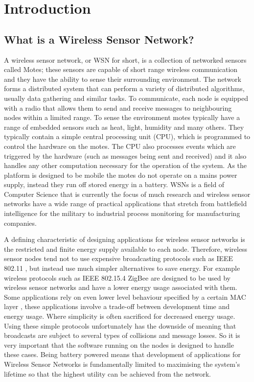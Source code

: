 \section{Introduction}

\subsection{What is a Wireless Sensor Network?}

A wireless sensor network, or WSN for short, is a collection of networked sensors called Motes; these sensors are capable of short range wireless communication and they have the ability to sense their surrounding environment\cite{Mica2002,TankBible}. The network forms a distributed system that can perform a variety of distributed algorithms, usually data gathering and similar tasks. To communicate, each node is equipped with a radio that allows them to send and receive messages to neighbouring nodes within a limited range. To sense the environment motes typically have a range of embedded sensors such as heat, light, humidity and many others. They typically contain a simple central processing unit (CPU), which is programmed to control the hardware on the motes. The CPU also processes events which are triggered by the hardware (such as messages being sent and received) and it also handles any other computation necessary for the operation of the system. As the platform is designed to be mobile the motes do not operate on a mains power supply, instead they run off stored energy in a battery. WSNs is a field of Computer Science that is currently the focus of much research and wireless sensor networks have a wide range of practical applications that stretch from battlefield intelligence for the military\cite{?} to industrial process monitoring for manufacturing companies\cite{?}.

A defining characteristic of designing applications for wireless sensor networks is the restricted and finite energy supply available to each node. Therefore, wireless sensor nodes tend not to use expensive broadcasting protocols such as IEEE 802.11 \cite{Mica2002}, but instead use much simpler alternatives to save energy. For example wireless protocols such as IEEE 802.15.4 ZigBee \cite{1253873, 4014617} are designed to be used by wireless sensor networks and have a lower energy usage associated with them. Some applications rely on even lower level behaviour specified by a certain MAC layer \cite{5751321,4469515,?,BMAC,SMAC,XMAC}, these applications involve a trade-off between development time and energy usage. Where simplicity is often sacrificed for decreased energy usage. Using these simple protocols unfortunately has the downside of meaning that broadcasts are subject to several types of collisions and message losses. So it is very important that the software running on the nodes is designed to handle these cases. Being battery powered means that development of applications for Wireless Sensor Networks is fundamentally limited to maximising the system's lifetime so that the highest utility can be achieved from the network.

